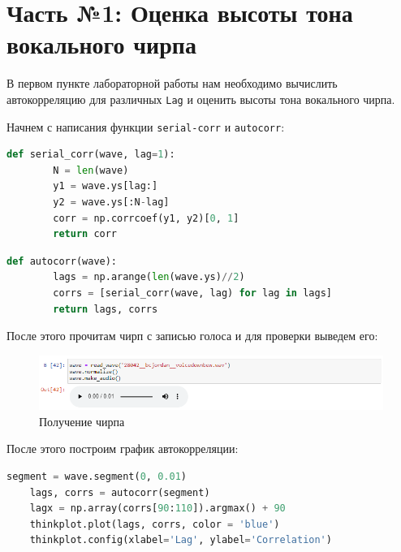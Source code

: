 \documentclass[a4paper]{article}
\begin{document}
    \newpage
        \section{Часть №1: Оценка высоты тона вокального чирпа}
            В первом пункте лабораторной работы нам необходимо вычислить автокорреляцию для различных \texttt{Lag} и оценить высоты тона вокального чирпа.
            
            Начнем с написания функции \texttt{serial-corr} и \texttt{autocorr}:
            
\begin{lstlisting}[language=Python, caption= Функция \texttt{serial-corr}]
    def serial_corr(wave, lag=1):
        N = len(wave)
        y1 = wave.ys[lag:]
        y2 = wave.ys[:N-lag]
        corr = np.corrcoef(y1, y2)[0, 1]
        return corr
\end{lstlisting}      

\begin{lstlisting}[language=Python, caption= Функция \texttt{autocorr}]
    def autocorr(wave):
        lags = np.arange(len(wave.ys)//2)
        corrs = [serial_corr(wave, lag) for lag in lags]
        return lags, corrs
\end{lstlisting} 
           
           После этого прочитам чирп с записью голоса и для проверки выведем его:
           
            \begin{figure}[H]
                \centering
                \includegraphics[width=\textwidth]{ex_1_audio.png}
                \caption{Получение чирпа}
                \label{fig:ex_1_audio}
            \end{figure}
           
           После этого построим график автокорреляции:
           
\begin{lstlisting}[language=Python, caption= Построение графика автокорреляции]
    segment = wave.segment(0, 0.01)
    lags, corrs = autocorr(segment)
    lagx = np.array(corrs[90:110]).argmax() + 90
    thinkplot.plot(lags, corrs, color = 'blue')
    thinkplot.config(xlabel='Lag', ylabel='Correlation')
\end{lstlisting}               
            
\end{document}
